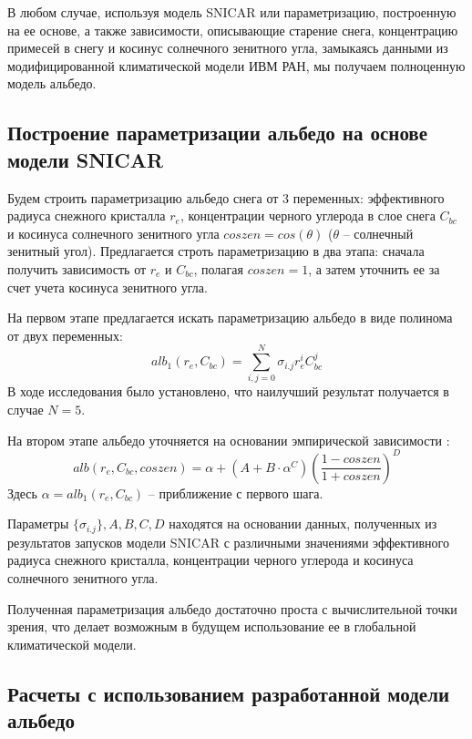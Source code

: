 \documentclass[a4paper, fontsize=14pt]{scrartcl}
\begin{document}
В любом случае, используя модель SNICAR или параметризацию, построенную на ее основе, а также зависимости, описывающие старение снега, концентрацию примесей в снегу и косинус солнечного зенитного угла, замыкаясь данными из модифицированной климатической модели ИВМ РАН, мы получаем полноценную модель альбедо.

\subsection{Построение параметризации альбедо на основе модели SNICAR}

Будем строить параметризацию альбедо снега от 3 переменных: эффективного радиуса снежного кристалла $r_e$, концентрации черного углерода в слое снега $C_{bc}$ и косинуса солнечного зенитного угла $coszen = cos(\theta)$ ($\theta$ -- солнечный зенитный угол). Предлагается строть параметризацию в два этапа: сначала получить зависимость от $r_e$ и $C_{bc}$, полагая $coszen = 1$, а затем уточнить ее за счет учета косинуса зенитного угла.

На первом этапе предлагается искать параметризацию альбедо в виде полинома от двух переменных:
\begin{equation}
    alb_1(r_e, C_{bc}) = \sum_{i,j = 0}^N \sigma_{i.j} r_e^i C_{bc}^j   \label{sys}  
\end{equation}
В ходе исследования \cite{mipt2020} было установлено, что наилучший результат получается в случае $N = 5$.

На втором этапе альбедо уточняется на основании эмпирической зависимости \cite{Saito2019}:
\begin{equation}
    alb(r_e, C_{bc}, coszen) = \alpha + (A + B \cdot \alpha^C) \left( \dfrac{1 - coszen}{1 + coszen} \right)^D     \label{sys}  
\end{equation}
Здесь $\alpha = alb_1(r_e, C_{bc})$ -- приближение с первого шага.

Параметры $\{ \sigma_{i.j} \}, A, B, C, D$ находятся на основании данных, полученных из результатов запусков модели SNICAR с различными значениями эффективного радиуса снежного кристалла, концентрации черного углерода и косинуса солнечного зенитного угла.

Полученная параметризация альбедо достаточно проста с вычислительной точки зрения, что делает возможным в будущем использование ее в глобальной климатической модели.

\subsection{Расчеты с использованием разработанной модели альбедо}
\end{document}

